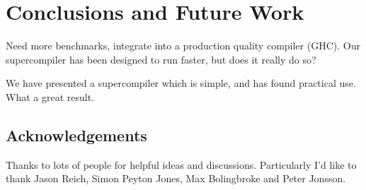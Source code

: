 \documentclass{sigplanconf}
\begin{document}
\section{Conclusions and Future Work}

Need more benchmarks, integrate into a production quality compiler (GHC). Our supercompiler has been designed to run faster, but does it really do so?

We have presented a supercompiler which is simple, and has found practical use. What a great result.


\subsection{Acknowledgements}

Thanks to lots of people for helpful ideas and discussions. Particularly I'd like to thank Jason Reich, Simon Peyton Jones, Max Bolingbroke and Peter Jonsson.



\end{document}
